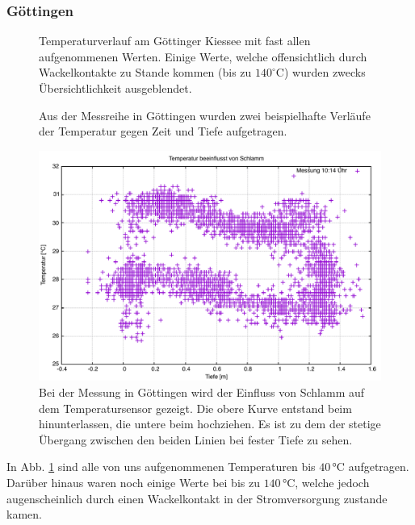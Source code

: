 \documentclass[12pt,a4paper,titlepage,headinclude,bibtotoc]{scrartcl}
\numberwithin{equation}{subsection}
\begin{document}
\subsubsection{Göttingen}
\begin{figure}[h]
\centering

\caption{Temperaturverlauf am Göttinger Kiessee mit fast allen aufgenommenen Werten. Einige Werte, welche offensichtlich durch Wackelkontakte zu Stande kommen (bis zu $140^\circ$C) wurden zwecks Übersichtlichkeit ausgeblendet.}
\label{fig:temp_goe}
\end{figure}
\begin{figure}[!h]
	\centering
   \hfill
	\caption{Aus der Messreihe in Göttingen wurden zwei beispielhafte Verläufe der Temperatur gegen Zeit und Tiefe aufgetragen.}
	\label{fig:tempGoeBsp}
\end{figure}
\begin{figure}[!h]
	\centering
	\includegraphics[width=0.8\linewidth]{TempSchlamm}
	\caption{Bei der Messung in Göttingen wird der Einfluss von Schlamm auf dem Temperatursensor gezeigt. Die obere Kurve entstand beim hinunterlassen, die untere beim hochziehen. Es ist zu dem der stetige Übergang zwischen den beiden Linien bei fester Tiefe zu sehen.}
	\label{fig:tempSchlamm}
\end{figure}
In Abb. \ref{fig:temp_goe} sind alle von uns aufgenommenen Temperaturen bis $40\,\si{\celsius}$ aufgetragen.
Dar\"uber hinaus waren noch einige Werte bei bis zu $140\,\si{\celsius}$, welche jedoch augenscheinlich durch einen Wackelkontakt in der Stromversorgung zustande kamen.
\end{document}
